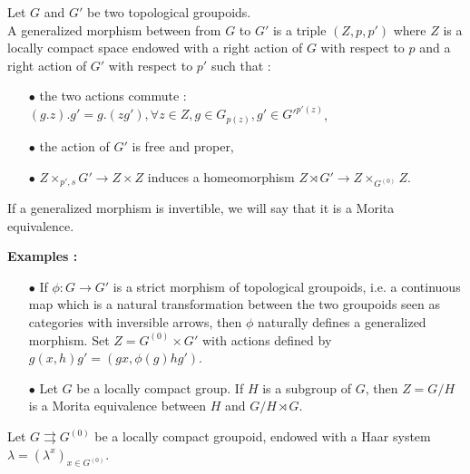 \begin{definition}
Let $G$ and $G'$ be two topological groupoids.\\ 
A generalized morphism between from $G$ to $G'$ is a triple $(Z,p,p')$ where $Z$ is a locally compact space endowed with a right action of $G$ with respect to $p$ and a right action of $G'$ with respect to $p'$ such that :
\begin{itemize}
\item[$\bullet$] the two actions commute : $(g.z).g'=g.(zg'),\forall z\in Z,g\in G_{p(z)},g'\in G'^{p'(z)}$,
\item[$\bullet$] the action of $G'$ is free and proper,
\item[$\bullet$] $Z\times_{p',s} G'\rightarrow Z\times Z $ induces a homeomorphism $Z\rtimes G' \rightarrow Z\times_{G^{(0)}} Z$.\\
\end{itemize}
If a generalized morphism is invertible, we will say that it is a Morita equivalence.
\end{definition}

\textbf{Examples :}
\begin{itemize}
\item[$\bullet$] If $\phi : G\rightarrow G'$ is a strict morphism of topological groupoids, i.e. a continuous map which is a natural transformation between the two groupoids seen as categories with inversible arrows, then $\phi$ naturally defines a generalized morphism. Set $Z = G^{(0)}\times G'$ with actions defined by $g(x,h)g' = (gx, \phi(g)hg')$.
\item[$\bullet$] Let $G$ be a locally compact group. If $H$ is a subgroup of $G$, then $Z=G/H$ is a Morita equivalence between $H$ and $G/H\rtimes G$.\\
\end{itemize}

Let $G \rightrightarrows G^{(0)}$ be a locally compact groupoid, endowed with a Haar system $\lambda = (\lambda^x)_{x\in G^{(0)}}$.\\


